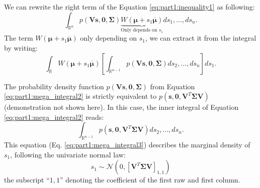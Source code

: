We can rewrite the right term of the Equation \ref{eq:part1:inequality1} as following:
\begin{equation}
\int_{\mathbb{R}^n} p(\boldsymbol{V}\!\boldsymbol{s},\boldsymbol{0},\boldsymbol{\Sigma}) \underbrace{W(\boldsymbol{\mu}+s_1 \overline{\boldsymbol{\mu}})}_{\text{Only depends on $s_1$}}ds_1, ..., ds_n.
\label{eq:part1:mega_integral1}
\end{equation}
The term $W(\boldsymbol{\mu}+s_1 \overline{\boldsymbol{\mu}})$ only depending on $s_1$, we can extract it from the integral by writing:
\begin{equation}
\int_{\mathbb{R}} W(\boldsymbol{\mu}+s_1 \overline{\boldsymbol{\mu}}) \left[\int_{\mathbb{R}^{n-1}} p(\boldsymbol{V}\!\boldsymbol{s},\boldsymbol{0},\boldsymbol{\Sigma}) ds_2, ..., ds_n \right] ds_1.
\label{eq:part1:mega_integral2}
\end{equation}

The probability density function $p(\boldsymbol{V}\!\boldsymbol{s},\boldsymbol{0},\boldsymbol{\Sigma})$ from Equation \ref{eq:part1:mega_integral2} is strictly equivalent to $p(\boldsymbol{s},\boldsymbol{0},\boldsymbol{V}^T\boldsymbol{\Sigma}\boldsymbol{V})$ (demonstration not shown here).
In this case, the inner integral of Equation \ref{eq:part1:mega_integral2} reads:
\begin{equation}
\int_{\mathbb{R}^{n-1}} p(\boldsymbol{s},\boldsymbol{0},\boldsymbol{V}^T\boldsymbol{\Sigma}\boldsymbol{V}) ds_2, ..., ds_n.
\label{eq:part1:mega_integral3}
\end{equation}
This equation (Eq. \ref{eq:part1:mega_integral3}) describes the marginal density of $s_1$, following the univariate normal law:
\begin{equation}
s_1 \sim \mathcal{N}(0, \left[\boldsymbol{V}^T\boldsymbol{\Sigma}\boldsymbol{V}\right]_{1,1})
\label{eq:part1:univariate1}
\end{equation}
the subscript ``$1,1$'' denoting the coefficient of the first raw and first column.

